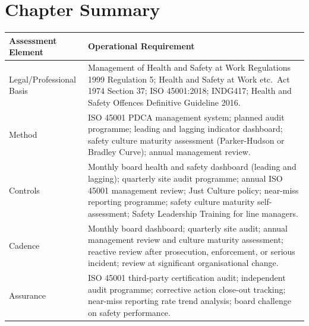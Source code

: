 
\newpage
\section{Chapter Summary}

\begin{table}[H]
\centering
\begin{tabularx}{\textwidth}{>{\raggedright\arraybackslash}p{3.2cm}X}
\toprule
\textbf{Assessment Element} & \textbf{Operational Requirement} \\
\midrule
Legal/Professional Basis & Management of Health and Safety at Work Regulations 1999 Regulation 5; Health and Safety at Work etc.\ Act 1974 Section 37; ISO 45001:2018; INDG417; Health and Safety Offences Definitive Guideline 2016. \\
Method & ISO 45001 PDCA management system; planned audit programme; leading and lagging indicator dashboard; safety culture maturity assessment (Parker-Hudson or Bradley Curve); annual management review. \\
Controls & Monthly board health and safety dashboard (leading and lagging); quarterly site audit programme; annual ISO 45001 management review; Just Culture policy; near-miss reporting programme; safety culture maturity self-assessment; Safety Leadership Training for line managers. \\
Cadence & Monthly board dashboard; quarterly site audit; annual management review and culture maturity assessment; reactive review after prosecution, enforcement, or serious incident; review at significant organisational change. \\
Assurance & ISO 45001 third-party certification audit; independent audit programme; corrective action close-out tracking; near-miss reporting rate trend analysis; board challenge on safety performance. \\
\bottomrule
\end{tabularx}
\end{table}

